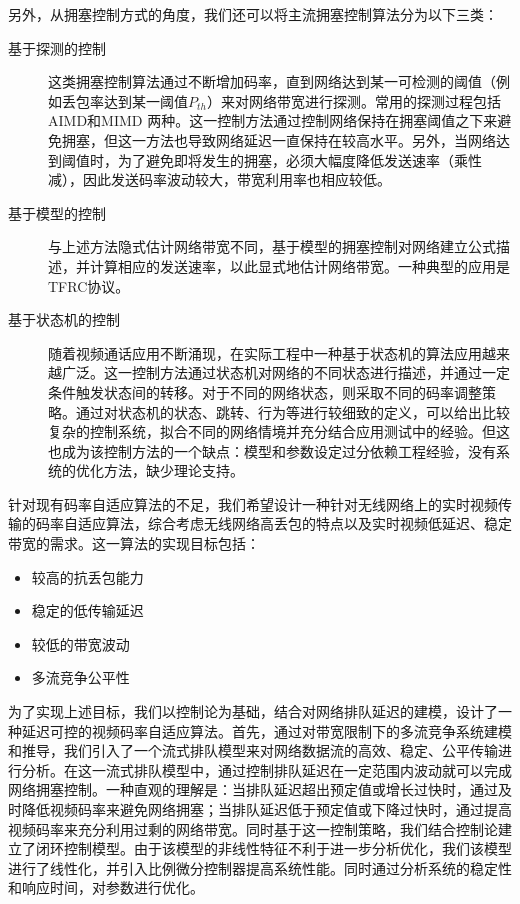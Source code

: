 另外，从拥塞控制方式的角度，我们还可以将主流拥塞控制算法分为以下三类：
\begin{description}
    \item[基于探测的控制] 这类拥塞控制算法通过不断增加码率，直到网络达到某一可检测的阈值（例如丢包率达到某一阈值$P_{th}$\cite{wu2000end}）来对网络带宽进行探测。常用的探测过程包括AIMD和MIMD 两种。这一控制方法通过控制网络保持在拥塞阈值之下来避免拥塞，但这一方法也导致网络延迟一直保持在较高水平。另外，当网络达到阈值时，为了避免即将发生的拥塞，必须大幅度降低发送速率（乘性减），因此发送码率波动较大，带宽利用率也相应较低。
    \item[基于模型的控制] 与上述方法隐式估计网络带宽不同，基于模型的拥塞控制对网络建立公式描述，并计算相应的发送速率，以此显式地估计网络带宽。一种典型的应用是TFRC协议。
    \item[基于状态机的控制] 随着视频通话应用不断涌现，在实际工程中一种基于状态机的算法应用越来越广泛。这一控制方法通过状态机对网络的不同状态进行描述，并通过一定条件触发状态间的转移。对于不同的网络状态，则采取不同的码率调整策略。通过对状态机的状态、跳转、行为等进行较细致的定义，可以给出比较复杂的控制系统，拟合不同的网络情境并充分结合应用测试中的经验。但这也成为该控制方法的一个缺点：模型和参数设定过分依赖工程经验，没有系统的优化方法，缺少理论支持。
\end{description}

针对现有码率自适应算法的不足，我们希望设计一种针对无线网络上的实时视频传输的码率自适应算法，综合考虑无线网络高丢包的特点以及实时视频低延迟、稳定带宽的需求。这一算法的实现目标包括：
\begin{itemize}
    \item 较高的抗丢包能力
    \item 稳定的低传输延迟
    \item 较低的带宽波动
    \item 多流竞争公平性
\end{itemize}

为了实现上述目标，我们以控制论为基础，结合对网络排队延迟的建模，设计了一种延迟可控的视频码率自适应算法。首先，通过对带宽限制下的多流竞争系统建模和推导，我们引入了一个流式排队模型来对网络数据流的高效、稳定、公平传输进行分析。在这一流式排队模型中，通过控制排队延迟在一定范围内波动就可以完成网络拥塞控制。一种直观的理解是：当排队延迟超出预定值或增长过快时，通过及时降低视频码率来避免网络拥塞；当排队延迟低于预定值或下降过快时，通过提高视频码率来充分利用过剩的网络带宽。同时基于这一控制策略，我们结合控制论建立了闭环控制模型。由于该模型的非线性特征不利于进一步分析优化，我们该模型进行了线性化，并引入比例微分控制器提高系统性能。同时通过分析系统的稳定性和响应时间，对参数进行优化。

